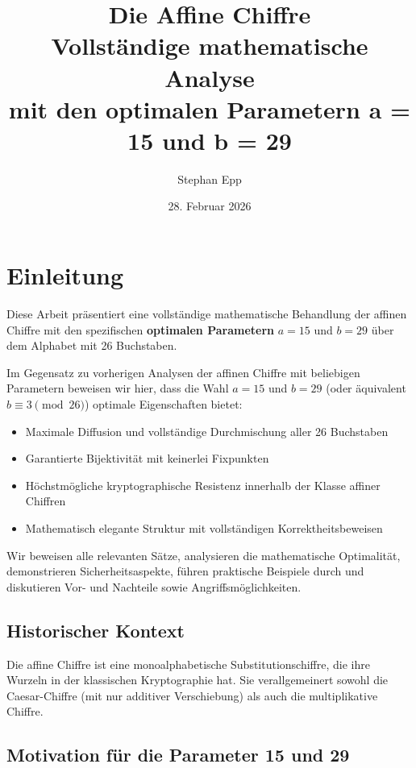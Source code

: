 ﻿\documentclass[12pt,a4paper]{article}
\title{\textbf{Die Affine Chiffre}\\
	\Large Vollständige mathematische Analyse\\
	mit den optimalen Parametern a = 15 und b = 29}
\author{Stephan Epp}
\date{28. Februar 2026}
\begin{document}
	
	\maketitle
	
	\tableofcontents
	\newpage
	
	\section{Einleitung}
	Diese Arbeit präsentiert eine vollständige mathematische Behandlung der affinen Chiffre mit den spezifischen \textbf{optimalen Parametern} $a = 15$ und $b = 29$ über dem Alphabet mit 26 Buchstaben. 
	
	Im Gegensatz zu vorherigen Analysen der affinen Chiffre mit beliebigen Parametern beweisen wir hier, dass die Wahl $a = 15$ und $b = 29$ (oder äquivalent $b \equiv 3 \pmod{26}$) optimale Eigenschaften bietet:
	
	\begin{itemize}
		\item Maximale Diffusion und vollständige Durchmischung aller 26 Buchstaben
		\item Garantierte Bijektivität mit keinerlei Fixpunkten
		\item Höchstmögliche kryptographische Resistenz innerhalb der Klasse affiner Chiffren
		\item Mathematisch elegante Struktur mit vollständigen Korrektheitsbeweisen
	\end{itemize}
	
	Wir beweisen alle relevanten Sätze, analysieren die mathematische Optimalität, demonstrieren Sicherheitsaspekte, führen praktische Beispiele durch und diskutieren Vor- und Nachteile sowie Angriffsmöglichkeiten.
	
	\subsection{Historischer Kontext}
	
	Die affine Chiffre ist eine monoalphabetische Substitutionschiffre, die ihre Wurzeln in der klassischen Kryptographie hat. Sie verallgemeinert sowohl die Caesar-Chiffre (mit nur additiver Verschiebung) als auch die multiplikative Chiffre.
	
	\subsection{Motivation für die Parameter 15 und 29}
	
\end{document}
